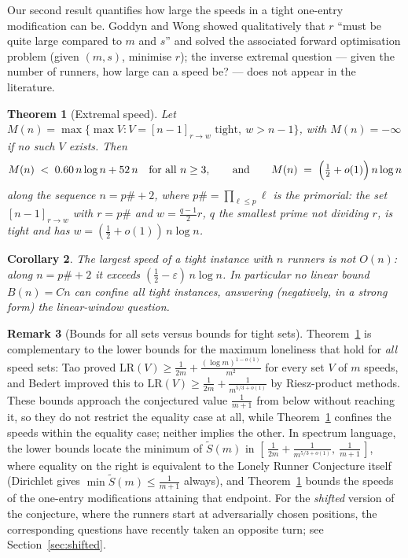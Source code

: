 \documentclass[11pt]{article}
\newtheorem{theorem}{Theorem}[section]
\newtheorem{corollary}[theorem]{Corollary}
\theoremstyle{definition}
\newtheorem{remark}[theorem]{Remark}
\newcommand{\LR}{\mathrm{LR}}
\begin{document}
Our second result quantifies how large the speeds in a tight one-entry
modification can be. Goddyn and Wong showed qualitatively that $r$ ``must be
quite large compared to $m$ and $s$'' and solved the associated forward
optimisation problem (given $(m,s)$, minimise $r$); the inverse extremal
question --- given the number of runners, how large can a speed be? --- does
not appear in the literature.

\begin{theorem}[Extremal speed]\label{thm:B}
Let $M(n)=\max\{\max V: V=[n-1]_{r\to w} \text{ tight},\ w>n-1\}$, with
$M(n)=-\infty$ if no such $V$ exists. Then
\[
M(n)\;<\;0.60\,n\log n+52\,n\quad\text{for all }n\ge3,
\qquad\text{and}\qquad
M(n)\;=\;\Bigl(\tfrac12+o(1)\Bigr)\,n\log n
\]
along the sequence $n=p\#+2$, where $p\#=\prod_{\ell\le p}\ell$ is the
primorial: the set $[n-1]_{r\to w}$ with $r=p\#$ and $w=\frac{q-1}{2}r$, $q$
the smallest prime not dividing $r$, is tight and has
$w=(\frac12+o(1))\,n\log n$.
\end{theorem}

\begin{corollary}\label{cor:B}
The largest speed of a tight instance with $n$ runners is not $O(n)$:
along $n=p\#+2$ it exceeds $(\tfrac12-\varepsilon)\,n\log n$. In particular
no linear bound $B(n)=Cn$ can confine all tight instances, answering
(negatively, in a strong form) the linear-window question.
\end{corollary}

\begin{remark}[Bounds for all sets versus bounds for tight sets]\label{rem:bedert}
Theorem~\ref{thm:B} is complementary to the lower bounds for the maximum
loneliness that hold for \emph{all} speed sets: Tao \cite{Tao2017} proved
$\LR(V)\ge\tfrac1{2m}+\tfrac{(\log m)^{1-o(1)}}{m^{2}}$ for every set $V$
of $m$ speeds, and Bedert \cite{Bedert2025} improved this to
$\LR(V)\ge\tfrac1{2m}+\tfrac1{m^{5/3+o(1)}}$ by Riesz-product methods.
These bounds approach the conjectured value $\tfrac1{m+1}$ from below
without reaching it, so they do not restrict the equality case at all,
while Theorem~\ref{thm:B} confines the speeds within the equality case;
neither implies the other.  In spectrum language, the lower bounds
locate the minimum of $\widetilde{S}(m)$ in
$[\,\tfrac1{2m}+\tfrac1{m^{5/3+o(1)}},\ \tfrac1{m+1}\,]$, where
equality on the right is equivalent to the Lonely Runner Conjecture
itself (Dirichlet gives $\min\widetilde{S}(m)\le\tfrac1{m+1}$ always),
and Theorem~\ref{thm:B} bounds the speeds of the one-entry modifications
attaining that endpoint.  For the \emph{shifted} version of the
conjecture, where the runners start at adversarially chosen positions,
the corresponding questions have recently taken an opposite turn; see
Section~\ref{sec:shifted}.
\end{remark}
\end{document}
